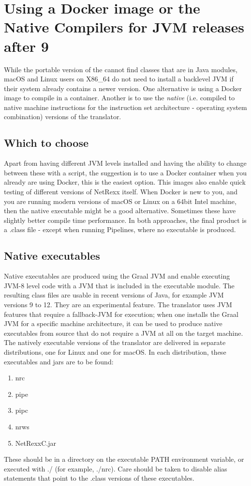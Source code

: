 \chapter{Using a Docker image or the Native Compilers for JVM releases after 9}\label{native compiler}
While the portable version of the \nr{} cannot find classes that are in Java modules, macOS and Linux users on X86\_64 do not need to install a backlevel JVM if their system already contains a newer version. One alternative is using a Docker image to compile in a container. Another is to use the \emph{native} (i.e. compiled to native machine instructions for the instruction set architecture - operating system combination) versions of the translator.
\section{Which to choose}
Apart from having different JVM levels installed and having the ability to change between these with a script, the suggestion is to use a Docker container when you already are using Docker, this is the easiest option. This images also enable quick testing of different versions of NetRexx itself. When Docker is new to you, and you are running modern versions of macOS or Linux on a 64bit Intel machine, then the native executable might be a good alternative. Sometimes these have slightly better compile time performance. In both approaches, the final product is a .class file - except when running \nr{} Pipelines, where no executable is produced.
\section{Native executables}
Native executables are produced using the Graal JVM and enable executing JVM-8 level code with a JVM that is included in the executable module. The resulting class files are usable in recent versions of Java, for example JVM versions 9 to 12. They are an experimental feature. The \nr{} translator uses JVM features that require a fallback-JVM for execution; when one installs the Graal JVM for a specific machine architecture, it can be used to produce native executables from \nr{} source that do not require a JVM at all on the target machine. The natively executable versions of the translator are delivered in separate distributions, one for Linux and one for macOS. In each distribution, these executables and jars are to be found:
\begin{enumerate}
\item nrc
\item pipe
\item pipc
\item nrws
\item NetRexxC.jar
\end{enumerate}
These should be in a directory on the executable PATH environment variable, or executed with ./ (for example, ./nrc). Care should be taken to disable alias statements that point to the .class versions of these executables.
